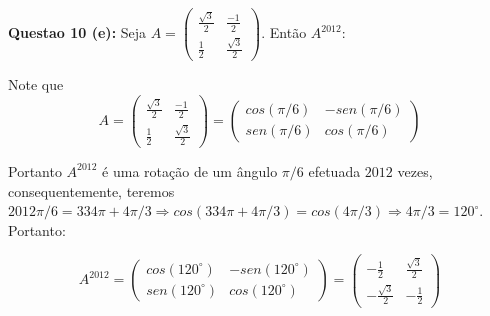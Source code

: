 \documentclass{article}
\begin{document}
\textbf{Questao 10 (e):} Seja 
$
A = 
\left(
\begin{array}{cc}
      \frac{\sqrt{3}}{2} & \frac{-1}{2} \\
      \frac{1}{2} & \frac{\sqrt{3}}{2} 
\end{array}
\right)
$. Então $A^{2012}$:

Note que 
$$A = 
\left(
\begin{array}{cc}
      \frac{\sqrt{3}}{2} & \frac{-1}{2} \\
      \frac{1}{2} & \frac{\sqrt{3}}{2} 
\end{array} 
\right) =
\left(
\begin{array}{cc}
      cos(\pi/6) & -sen(\pi/6) \\
      sen(\pi/6) & cos(\pi/6) 
\end{array} 
\right)
$$

Portanto $A^{2012}$ é uma rotação de um ângulo $\pi/6$ efetuada $2012$ vezes,
consequentemente, teremos $2012\pi/6 = 334\pi + 4\pi/3 \Rightarrow cos(334\pi +
4\pi/3) = cos(4\pi/3) \Rightarrow 4\pi/3 = 120^{\circ}$. Portanto:

$$A^{2012} = 
\left(
\begin{array}{cc}
      cos(120^{\circ}) & -sen(120^{\circ}) \\
      sen(120^{\circ}) & cos(120^{\circ}) 
\end{array} 
\right) =
\left(
\begin{array}{cc}
      -\frac{1}{2} & \frac{\sqrt{3}}{2} \\
      -\frac{\sqrt{3}}{2} & -\frac{1}{2} 
\end{array} 
\right) 
$$
\end{document}
